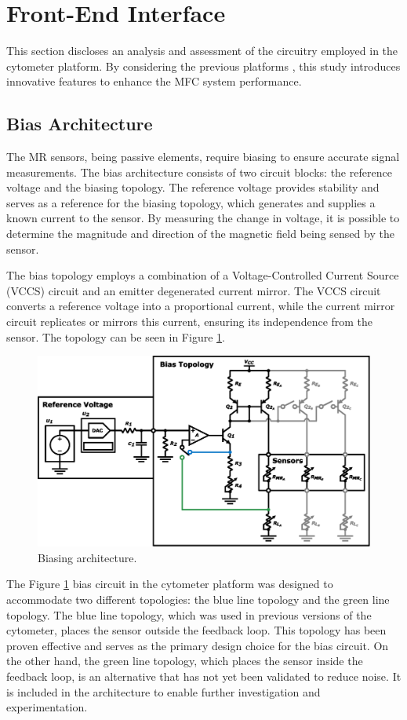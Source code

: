 \section{Front-End Interface}
\label{sec:fei}

This section discloses an analysis and assessment of the circuitry employed in the cytometer platform. By considering the previous platforms \cite{PMID24761029, Germano2006MICROSYSTEMFB, TIM.2013.2296417}, this study introduces innovative features to enhance the MFC system performance.

\subsection{Bias Architecture}

The MR sensors, being passive elements, require biasing to ensure accurate signal measurements. The bias architecture consists of two circuit blocks: the reference voltage and the biasing topology. The reference voltage provides stability and serves as a reference for the biasing topology, which generates and supplies a known current to the sensor. By measuring the change in voltage, it is possible to determine the magnitude and direction of the magnetic field being sensed by the sensor.

The bias topology employs a combination of a Voltage-Controlled Current Source (VCCS) circuit and an emitter degenerated current mirror. The VCCS circuit converts a reference voltage into a proportional current, while the current mirror circuit replicates or mirrors this current, ensuring its independence from the sensor. The topology can be seen in Figure \ref{fig:bias-full}.

\begin{figure}[!ht]
    \centering
    \includegraphics[width=.475\textwidth]{figs/bias_full.eps}
    \caption{Biasing architecture.}
    \label{fig:bias-full}
\end{figure}

The Figure \ref{fig:bias-full} bias circuit in the cytometer platform was designed to accommodate two different topologies: the blue line topology and the green line topology.
The blue line topology, which was used in previous versions of the cytometer, places the sensor outside the feedback loop. This topology has been proven effective and serves as the primary design choice for the bias circuit. On the other hand, the green line topology, which places the sensor inside the feedback loop, is an alternative that has not yet been validated to reduce noise. It is included in the architecture to enable further investigation and experimentation.

